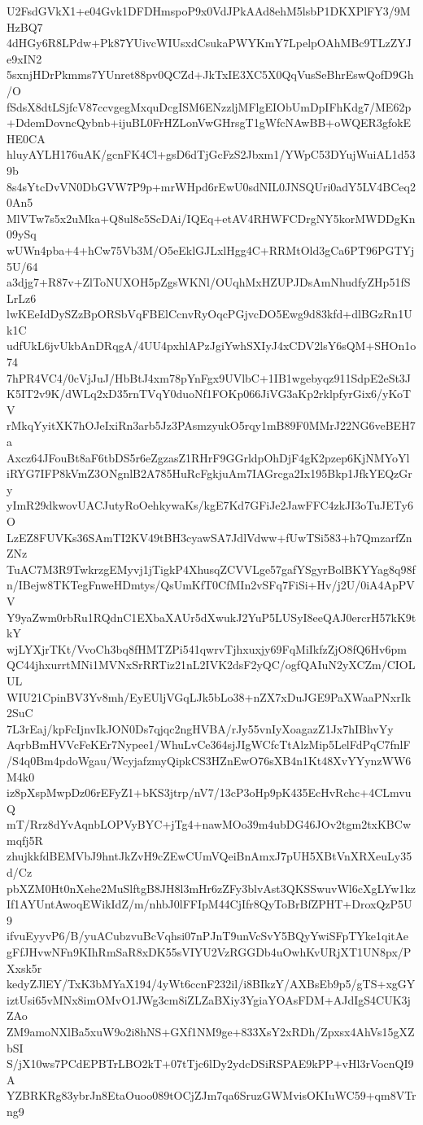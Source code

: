 U2FsdGVkX1+e04Gvk1DFDHmspoP9x0VdJPkAAd8ehM5lsbP1DKXPlFY3/9MHzBQ7
4dHGy6R8LPdw+Pk87YUivcWIUsxdCsukaPWYKmY7LpelpOAhMBc9TLzZYJe9xIN2
5sxnjHDrPkmms7YUnret88pv0QCZd+JkTxIE3XC5X0QqVusSeBhrEswQofD9Gh/O
fSdsX8dtLSjfcV87ccvgegMxquDcgISM6ENzzljMFlgEIObUmDpIFhKdg7/ME62p
+DdemDovncQybnb+ijuBL0FrHZLonVwGHrsgT1gWfcNAwBB+oWQER3gfokEHE0CA
hluyAYLH176uAK/gcnFK4Cl+gsD6dTjGcFzS2Jbxm1/YWpC53DYujWuiAL1d539b
8s4sYtcDvVN0DbGVW7P9p+mrWHpd6rEwU0sdNIL0JNSQUri0adY5LV4BCeq20An5
MlVTw7s5x2uMka+Q8ul8c5ScDAi/IQEq+etAV4RHWFCDrgNY5korMWDDgKn09ySq
wUWn4pba+4+hCw75Vb3M/O5eEklGJLxlHgg4C+RRMtOld3gCa6PT96PGTYj5U/64
a3djg7+R87v+ZlToNUXOH5pZgsWKNl/OUqhMxHZUPJDsAmNhudfyZHp51fSLrLz6
lwKEeIdDySZzBpORSbVqFBElCcnvRyOqcPGjvcDO5Ewg9d83kfd+dlBGzRn1Uk1C
udfUkL6jvUkbAnDRqgA/4UU4pxhlAPzJgiYwhSXIyJ4xCDV2lsY6sQM+SHOn1o74
7hPR4VC4/0cVjJuJ/HbBtJ4xm78pYnFgx9UVlbC+1IB1wgebyqz911SdpE2eSt3J
K5IT2v9K/dWLq2xD35rnTVqY0duoNf1FOKp066JiVG3aKp2rklpfyrGix6/yKoTV
rMkqYyitXK7hOJeIxiRn3arb5Jz3PAsmzyukO5rqy1mB89F0MMrJ22NG6veBEH7a
Axcz64JFouBt8aF6tbDS5r6eZgzasZ1RHrF9GGrldpOhDjF4gK2pzep6KjNMYoYl
iRYG7IFP8kVmZ3ONgnlB2A785HuRcFgkjuAm7IAGrcga2Ix195Bkp1JfkYEQzGry
yImR29dkwovUACJutyRoOehkywaKs/kgE7Kd7GFiJe2JawFFC4zkJI3oTuJETy6O
LzEZ8FUVKs36SAmTI2KV49tBH3cyawSA7JdlVdww+fUwTSi583+h7QmzarfZnZNz
TuAC7M3R9TwkrzgEMyvj1jTigkP4XhusqZCVVLge57gafYSgyrBolBKYYag8q98f
n/IBejw8TKTegFnweHDmtys/QsUmKfT0CfMIn2vSFq7FiSi+Hv/j2U/0iA4ApPVV
Y9yaZwm0rbRu1RQdnC1EXbaXAUr5dXwukJ2YuP5LUSyI8eeQAJ0ercrH57kK9tkY
wjLYXjrTKt/VvoCh3bq8fHMTZPi541qwrvTjhxuxjy69FqMiIkfzZjO8fQ6Hv6pm
QC44jhxurrtMNi1MVNxSrRRTiz21nL2IVK2dsF2yQC/ogfQAIuN2yXCZm/CIOLUL
WIU21CpinBV3Yv8mh/EyEUljVGqLJk5bLo38+nZX7xDuJGE9PaXWaaPNxrIk2SuC
7L3rEaj/kpFcIjnvIkJON0Ds7qjqc2ngHVBA/rJy55vnIyXoagazZ1Jx7hIBhvYy
AqrbBmHVVcFeKEr7Nypee1/WhuLvCe364sjJIgWCfcTtAlzMip5LelFdPqC7fnlF
/S4q0Bm4pdoWgau/WcyjafzmyQipkCS3HZnEwO76sXB4n1Kt48XvYYynzWW6M4k0
iz8pXspMwpDz06rEFyZ1+bKS3jtrp/nV7/13cP3oHp9pK435EcHvRchc+4CLmvuQ
mT/Rrz8dYvAqnbLOPVyBYC+jTg4+nawMOo39m4ubDG46JOv2tgm2txKBCwmqfj5R
zhujkkfdBEMVbJ9hntJkZvH9cZEwCUmVQeiBnAmxJ7pUH5XBtVnXRXeuLy35d/Cz
pbXZM0Ht0nXehe2MuSlftgB8JH8l3mHr6zZFy3blvAst3QKSSwuvWl6cXgLYw1kz
If1AYUntAwoqEWikIdZ/m/nhbJ0lFFIpM44CjIfr8QyToBrBfZPHT+DroxQzP5U9
ifvuEyyvP6/B/yuACubzvuBcVqhsi07nPJnT9unVcSvY5BQyYwiSFpTYke1qitAe
gFfJHvwNFn9KIhRmSaR8xDK55sVIYU2VzRGGDb4uOwhKvURjXT1UN8px/PXxsk5r
kedyZJlEY/TxK3bMYaX194/4yWt6ccnF232il/i8BIkzY/AXBsEb9p5/gTS+xgGY
iztUsi65vMNx8imOMvO1JWg3cm8iZLZaBXiy3YgiaYOAsFDM+AJdIgS4CUK3jZAo
ZM9amoNXlBa5xuW9o2i8hNS+GXf1NM9ge+833XsY2xRDh/Zpxsx4AhVs15gXZbSI
S/jX10ws7PCdEPBTrLBO2kT+07tTjc6lDy2ydcDSiRSPAE9kPP+vHl3rVocnQI9A
YZBRKRg83ybrJn8EtaOuoo089tOCjZJm7qa6SruzGWMvisOKIuWC59+qm8VTrng9
